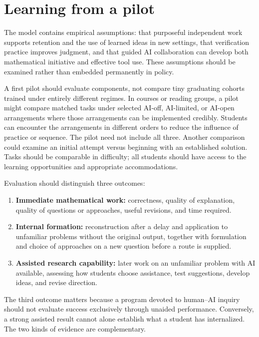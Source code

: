 \documentclass[11pt]{article}
\begin{document}
\section{Learning from a pilot}
\label{sec:pilot}

The model contains empirical assumptions: that purposeful independent work supports
retention and the use of learned ideas in new settings, that verification practice
improves judgment, and that guided
AI collaboration can develop both mathematical initiative and effective tool use.
These assumptions should be examined rather than embedded permanently in policy.

A first pilot should evaluate components, not compare tiny graduating cohorts trained
under entirely different regimes. In courses or reading groups, a pilot might compare
matched tasks under selected AI-off, AI-limited, or AI-open arrangements where those
arrangements can be implemented credibly. Students can encounter the arrangements in
different orders to reduce the influence of practice or sequence. The pilot need not
include all three. Another comparison could examine an initial attempt versus beginning
with an established solution. Tasks should be comparable in difficulty; all students
should have access to the learning opportunities and appropriate accommodations.

Evaluation should distinguish three outcomes:
\begin{enumerate}
    \item \textbf{Immediate mathematical work:} correctness, quality of explanation,
    quality of questions or approaches, useful revisions, and time required.
    \item \textbf{Internal formation:} reconstruction after a delay and application
    to unfamiliar problems without the original output, together with formulation and
    choice of approaches on a new question before a route is supplied.
    \item \textbf{Assisted research capability:} later work on an unfamiliar problem
    with AI available, assessing how students choose assistance, test suggestions,
    develop ideas, and revise direction.
\end{enumerate}

The third outcome matters because a program devoted to human--AI inquiry should not
evaluate success exclusively through unaided performance. Conversely, a strong
assisted result cannot alone establish what a student has internalized. The two kinds
of evidence are complementary.
\end{document}

